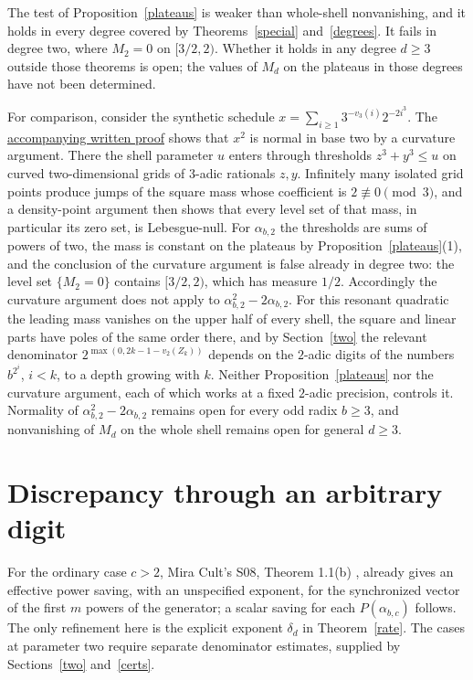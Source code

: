 \documentclass[11pt]{article}
\begin{document}
\begin{remark}\label{curvature}
The test of Proposition~\ref{plateaus} is weaker than whole-shell
nonvanishing, and it holds in every degree covered by
Theorems~\ref{special} and~\ref{degrees}. It fails in degree two, where
\(M_2=0\) on \([3/2,2)\). Whether it holds in any degree \(d\ge3\) outside
those theorems is open; the values of \(M_d\) on the plateaus in those
degrees have not been determined.

For comparison, consider the synthetic schedule
\(x=\sum_{i\ge1}3^{-v_3(i)}2^{-2i^3}\). The
\href{https://github.com/eldernos/MathematicsResearch/blob/c2c9da683666b3b9368e5d4b5cb858caccf528f5/notes/phase19/nonlinear.md}{accompanying written proof}
shows that \(x^2\) is normal in base two by a curvature argument. There
the shell parameter \(u\) enters through thresholds \(z^3+y^3\le u\) on
curved two-dimensional grids of \(3\)-adic rationals \(z,y\). Infinitely
many isolated grid points produce jumps of the square mass whose
coefficient is \(2\not\equiv0\pmod3\), and a density-point argument then
shows that every level set of that mass, in particular its zero set, is
Lebesgue-null. For \(\alpha_{b,2}\) the thresholds are sums of powers of
two, the mass is constant on the plateaus by
Proposition~\ref{plateaus}(1), and the conclusion of the curvature
argument is false already in degree two: the level set \(\{M_2=0\}\)
contains \([3/2,2)\), which has measure \(1/2\). Accordingly the curvature
argument does not apply to \(\alpha_{b,2}^2-2\alpha_{b,2}\). For this
resonant quadratic the leading mass vanishes on the upper half of every
shell, the square and linear parts have poles of the same order there,
and by Section~\ref{two} the relevant denominator
\(2^{\max(0,2k-1-v_2(Z_k))}\) depends on the \(2\)-adic digits of the
numbers \(b^{2^i}\), \(i<k\), to a depth growing with \(k\). Neither
Proposition~\ref{plateaus} nor the curvature argument, each of which
works at a fixed \(2\)-adic precision, controls it. Normality of
\(\alpha_{b,2}^2-2\alpha_{b,2}\) remains open for every odd radix
\(b\ge3\), and nonvanishing of \(M_d\) on the whole shell remains open for
general \(d\ge3\).
\end{remark}

\section{Discrepancy through an arbitrary digit}\label{ratesec}
For the ordinary case \(c>2\), Mira Cult's S08, Theorem 1.1(b)
\cite{mira2}, already gives an effective power saving, with an unspecified
exponent, for the synchronized vector of the first \(m\) powers of the
generator; a scalar saving for each \(P(\alpha_{b,c})\) follows. The only
refinement here is the explicit exponent \(\delta_d\) in
Theorem~\ref{rate}. The cases at parameter two require separate
denominator estimates, supplied by Sections~\ref{two} and~\ref{certs}.
\end{document}
